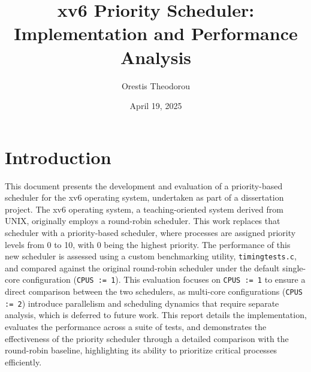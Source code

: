 \documentclass{article}
\title{xv6 Priority Scheduler: Implementation and Performance Analysis}
\author{Orestis Theodorou}
\date{April 19, 2025}
\begin{document}
\maketitle

\section{Introduction}
This document presents the development and evaluation of a priority-based scheduler for the xv6 operating system, undertaken as part of a dissertation project. The xv6 operating system, a teaching-oriented system derived from UNIX, originally employs a round-robin scheduler. This work replaces that scheduler with a priority-based scheduler, where processes are assigned priority levels from 0 to 10, with 0 being the highest priority. The performance of this new scheduler is assessed using a custom benchmarking utility, \texttt{timingtests.c}, and compared against the original round-robin scheduler under the default single-core configuration (\texttt{CPUS := 1}). This evaluation focuses on \texttt{CPUS := 1} to ensure a direct comparison between the two schedulers, as multi-core configurations (\texttt{CPUS := 2}) introduce parallelism and scheduling dynamics that require separate analysis, which is deferred to future work. This report details the implementation, evaluates the performance across a suite of tests, and demonstrates the effectiveness of the priority scheduler through a detailed comparison with the round-robin baseline, highlighting its ability to prioritize critical processes efficiently.
\end{document}
